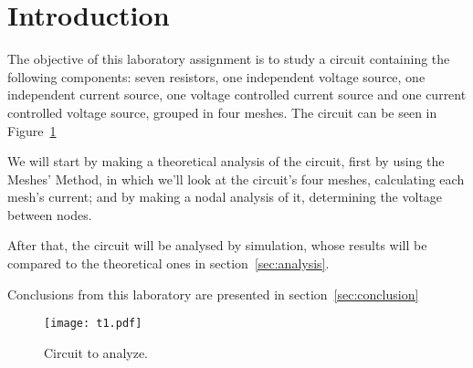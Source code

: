 \section{Introduction}

The objective of this laboratory assignment is to study a circuit containing the following components: seven resistors, one independent voltage source, one independent current source, one voltage controlled current source and one current controlled voltage source, grouped in four meshes. The circuit can be seen in Figure~\ref{Fig1: circuit}

We will start by making a theoretical analysis of the circuit, first by  using the Meshes' Method, in which we’ll look at the circuit’s four meshes, calculating each mesh’s current; and by making a nodal analysis of it, determining the voltage between nodes.

After that, the circuit will be analysed by simulation, whose results will be compared to the theoretical ones in section~\ref{sec:analysis}.

Conclusions from this laboratory are presented in section~\ref{sec:conclusion}

\begin{figure}[h] \centering
\texttt{[image: t1.pdf]}
\caption{Circuit to analyze.}
\label{Fig1: circuit}
\end{figure}
